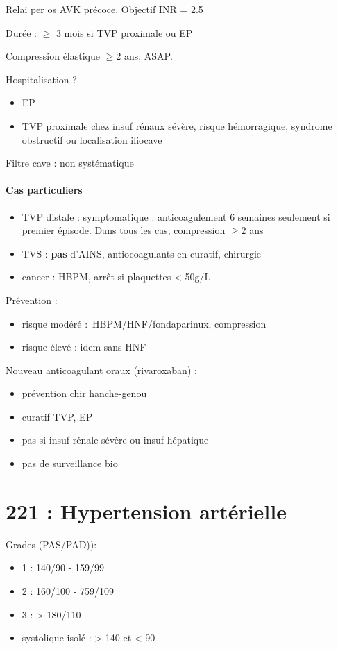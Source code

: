 \documentclass{article}
\begin{document}
Relai per os AVK précoce. Objectif INR = 2.5

Durée : $\ge$ 3 mois si TVP proximale ou EP

Compression élastique $\ge 2$ ans, ASAP. 

Hospitalisation ? 
\begin{itemize}
  \item EP
  \item TVP proximale chez insuf rénaux sévère, risque hémorragique, syndrome
    obstructif ou localisation iliocave
\end{itemize}

Filtre cave : non systématique

\paragraph{Cas particuliers}
\begin{itemize}
  \item 
TVP distale : symptomatique : anticoagulement 6 semaines seulement si premier épisode. Dans tous les cas,
compression $\ge 2$ ans
\item \gls{TVS} : \textbf{pas} d'AINS, antiocoagulants en curatif, chirurgie
\item cancer : HBPM, arrêt si plaquettes < 50g/L
\end{itemize}
Prévention : 
\begin{itemize}
  \item risque modéré : HBPM/HNF/fondaparinux, compression
  \item risque élevé : idem sans HNF
\end{itemize}

Nouveau anticoagulant oraux (rivaroxaban) :
\begin{itemize}
  \item prévention chir hanche-genou
  \item curatif TVP, EP
  \item pas si insuf rénale sévère ou insuf hépatique
  \item pas de surveillance bio
\end{itemize}

\section{221 : Hypertension artérielle}%
\label{sec:221_hypertension_arterielle}
Grades (\gls{PAS}/\gls{PAD})):
\begin{itemize}
  \item 1 : 140/90 - 159/99
  \item 2 : 160/100 - 759/109
  \item 3 : > 180/110
  \item systolique isolé : > 140 et < 90
\end{itemize}
\end{document}
